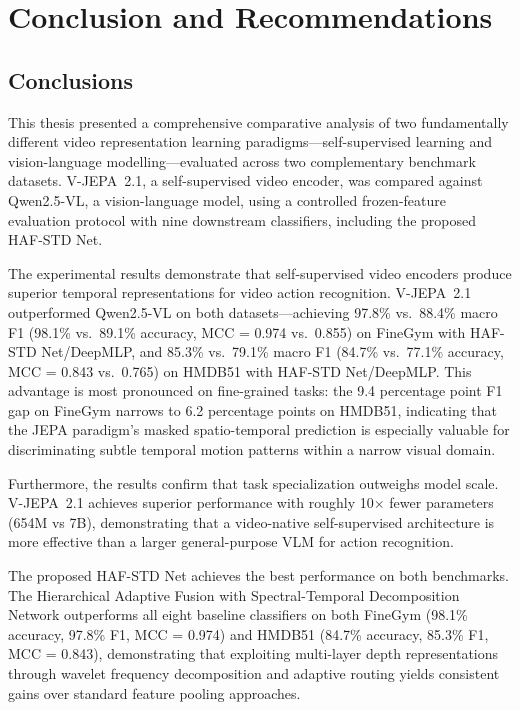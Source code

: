 \chapter{Conclusion and Recommendations}

\section{Conclusions}

This thesis presented a comprehensive comparative analysis of two fundamentally different video representation learning paradigms---self-supervised learning and vision-language modelling---evaluated across two complementary benchmark datasets. V-JEPA~2.1, a self-supervised video encoder, was compared against Qwen2.5-VL, a vision-language model, using a controlled frozen-feature evaluation protocol with nine downstream classifiers, including the proposed HAF-STD Net.

The experimental results demonstrate that self-supervised video encoders produce superior temporal representations for video action recognition. V-JEPA~2.1 outperformed Qwen2.5-VL on both datasets---achieving 97.8\% vs.\ 88.4\% macro F1 (98.1\% vs.\ 89.1\% accuracy, MCC = 0.974 vs.\ 0.855) on FineGym with HAF-STD Net/DeepMLP, and 85.3\% vs.\ 79.1\% macro F1 (84.7\% vs.\ 77.1\% accuracy, MCC = 0.843 vs.\ 0.765) on HMDB51 with HAF-STD Net/DeepMLP. This advantage is most pronounced on fine-grained tasks: the 9.4 percentage point F1 gap on FineGym narrows to 6.2 percentage points on HMDB51, indicating that the JEPA paradigm's masked spatio-temporal prediction is especially valuable for discriminating subtle temporal motion patterns within a narrow visual domain.

Furthermore, the results confirm that task specialization outweighs model scale. V-JEPA~2.1 achieves superior performance with roughly 10$\times$ fewer parameters (654M vs 7B), demonstrating that a video-native self-supervised architecture is more effective than a larger general-purpose VLM for action recognition.

The proposed HAF-STD Net achieves the best performance on both benchmarks. The Hierarchical Adaptive Fusion with Spectral-Temporal Decomposition Network outperforms all eight baseline classifiers on both FineGym (98.1\% accuracy, 97.8\% F1, MCC = 0.974) and HMDB51 (84.7\% accuracy, 85.3\% F1, MCC = 0.843), demonstrating that exploiting multi-layer depth representations through wavelet frequency decomposition and adaptive routing yields consistent gains over standard feature pooling approaches.

